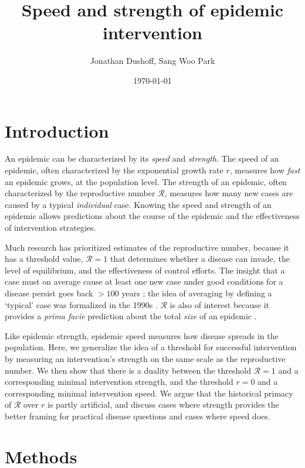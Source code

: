 \documentclass{article}\usepackage[]{graphicx}\usepackage[]{color}
\title{Speed and strength of epidemic intervention}
\author{Jonathan Dushoff, Sang Woo Park}
\date{\today}
\newcommand{\RR}{\ensuremath{{\mathcal R}}}
\begin{document}
\maketitle

\section{Introduction}

An epidemic can be characterized by its \emph{speed} and \emph{strength}.
The speed of an epidemic, often characterized by the exponential growth rate $r$, measures how \emph{fast} an epidemic grows, at the population level. 
The strength of an epidemic, often characterized by the reproductive number $\RR$, measures how many new cases are caused by a typical \emph{individual} case.
Knowing the speed and strength of an epidemic allows predictions about the course of the epidemic and the effectiveness of intervention strategies.

Much research has prioritized estimates of the reproductive number, because it has a threshold value, $\RR=1$ that determines whether a disease can invade, the level of equilibrium, and the effectiveness of control efforts. 
The insight that a case must on average cause at least one new case under good conditions for a disease persist goes back $>100$ years \citep{ross1911prevention};
the idea of averaging by defining a `typical' case was formalized in the 1990s \citep{diekmann1990definition}.
$\RR$ is also of interest because it provides a \emph{prima facie} prediction about the total \emph{size} of an epidemic \citep{anderson1991infectious, ma2006generality, miller2012note}. 

Like epidemic strength, epidemic speed measures how disease spreads in the population. 
Here, we generalize the idea of a threshold for successful intervention by measuring an intervention's strength on the same scale as the reproductive number. 
We then show that there is a duality between the threshold $\RR=1$ and a corresponding minimal intervention strength, and the threshold $r=0$ and a corresponding minimal intervention speed. 
We argue that the historical primacy of $\RR$ over $r$ is partly artificial, and discuss cases where strength provides the better framing for practical disease questions and cases where speed does.

\section{Methods}
\end{document}
